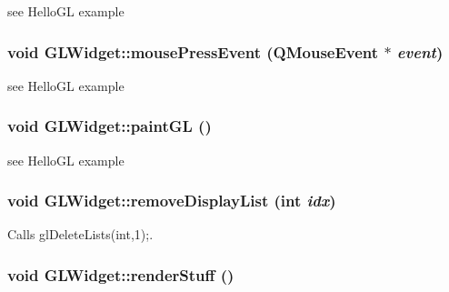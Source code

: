 see HelloGL example \hypertarget{class_g_l_widget_ab144cc8064c1bbf6d0ef0646ca0bd06c}{
\subsubsection[{mousePressEvent}]{\setlength{\rightskip}{0pt plus 5cm}void GLWidget::mousePressEvent (QMouseEvent $\ast$ {\em event})}}
\label{class_g_l_widget_ab144cc8064c1bbf6d0ef0646ca0bd06c}


see HelloGL example \hypertarget{class_g_l_widget_a640b5570cb2b37724fd5b58a77339c5e}{
\subsubsection[{paintGL}]{\setlength{\rightskip}{0pt plus 5cm}void GLWidget::paintGL ()}}
\label{class_g_l_widget_a640b5570cb2b37724fd5b58a77339c5e}


see HelloGL example \hypertarget{class_g_l_widget_a8b370af6f9b50bb5ae868664fd94eae6}{
\subsubsection[{removeDisplayList}]{\setlength{\rightskip}{0pt plus 5cm}void GLWidget::removeDisplayList (int {\em idx})}}
\label{class_g_l_widget_a8b370af6f9b50bb5ae868664fd94eae6}


Calls glDeleteLists(int,1);. \hypertarget{class_g_l_widget_aee1d7cc90f004a93605b3aa795efd75e}{
\subsubsection[{renderStuff}]{\setlength{\rightskip}{0pt plus 5cm}void GLWidget::renderStuff ()}}
\label{class_g_l_widget_aee1d7cc90f004a93605b3aa795efd75e}


